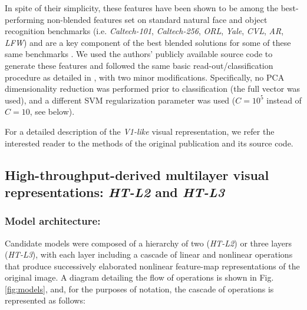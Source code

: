 In spite of their simplicity, these features have been shown to be among the
best-performing non-blended features set on standard natural face and object
recognition benchmarks \cite{pinto:plos08,pinto:eccv08,pinto:cvpr09} (i.e. \emph{Caltech-101}\cite{feifei2007lgv},
\emph{Caltech-256}\cite{caltech256}, \emph{ORL}\cite{orl},
\emph{Yale}\cite{yale}, \emph{CVL}\cite{cvl}, \emph{AR}\cite{ar}, \emph{LFW}\cite{huang:lfw}) and are a key component of the
best blended solutions for some of these same benchmarks
\cite{gehler:iccv09}. We used the authors' publicly available source code to
generate these features and followed the same basic read-out/classification
procedure as detailed in \cite{pinto:plos08}, with two minor modifications.
Specifically, no PCA dimensionality reduction was performed prior to
classification (the full vector was used), and a different SVM regularization
parameter was used ($C=10^5$ instead of $C=10$, see below).

For a detailed description of the \emph{V1-like} visual representation, we refer
the interested reader to the methods of the original publication
\cite{pinto:plos08} and its source code.


\subsection{High-throughput-derived multilayer visual representations: \emph{HT-L2} and \emph{HT-L3}}


\subsubsection{Model architecture: }

Candidate models were composed of a hierarchy of two (\emph{HT-L2}) or three
layers (\emph{HT-L3}), with each layer including a cascade of linear and
nonlinear operations that produce successively elaborated nonlinear feature-map
representations of the original image. A diagram detailing the flow of
operations is shown in Fig. \ref{fig:models}, and, for the purposes of notation,
the cascade of operations is represented as follows:

